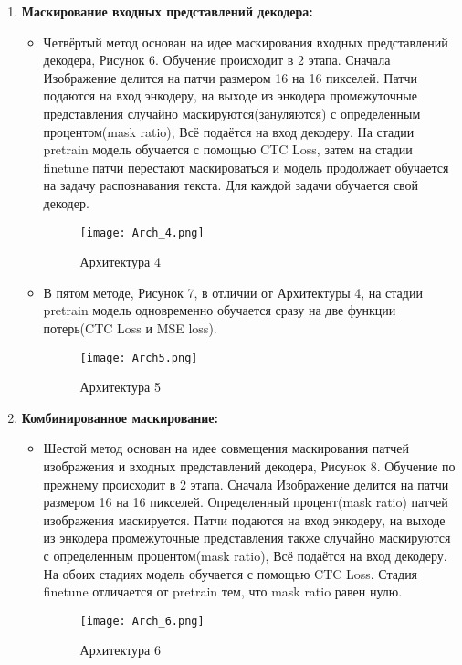 \begin{enumerate}
     \item  \textbf{Маскирование входных  представлений  декодера:}
     \begin{itemize}
          \item Четвёртый  метод основан на идее маскирования входных  представлений  декодера, Рисунок 6. Обучение происходит в 2 этапа. Сначала Изображение делится на патчи размером 16 на 16 пикселей. Патчи подаются на вход энкодеру, на выходе из энкодера промежуточные представления случайно маскируются(зануляются) с определенным процентом(mask ratio), Всё подаётся на вход декодеру.
               На стадии pretrain модель обучается с помощью CTC Loss, затем на стадии finetune патчи перестают маскироваться и модель продолжает обучается на задачу распознавания текста.
               Для каждой задачи обучается свой декодер.
               \begin{figure}[H]
                    \centering
                    \texttt{[image: Arch\_4.png]}
                    \caption{Архитектура 4}
               \end{figure}

          \item В пятом методе, Рисунок 7,  в отличии от Архитектуры 4, на стадии pretrain модель одновременно обучается сразу на две функции потерь(CTC Loss и MSE loss). 

          \begin{figure}[H]
               \centering
               \texttt{[image: Arch5.png]}
               \caption{Архитектура 5}
          \end{figure}

     \end{itemize}

     \item  \textbf{Комбинированное  маскирование:}
       \begin{itemize}
          \item Шестой  метод основан на идее совмещения  маскирования  патчей  изображения  и  входных  представлений  декодера, Рисунок 8. Обучение по прежнему происходит в 2 этапа. Сначала Изображение делится на патчи размером 16 на 16 пикселей. Определенный процент(mask ratio) патчей изображения маскируется. Патчи подаются на вход энкодеру, на выходе из энкодера промежуточные представления также случайно маскируются с определенным процентом(mask ratio), Всё подаётся на вход декодеру.
               На обоих стадиях модель обучается с помощью CTC Loss. Стадия finetune отличается от pretrain тем, что mask ratio равен нулю.
               \begin{figure}[H]
                    \centering
                    \texttt{[image: Arch\_6.png]}
                    \caption{Архитектура 6}
               \end{figure}
     \end{itemize}
\end{enumerate}

